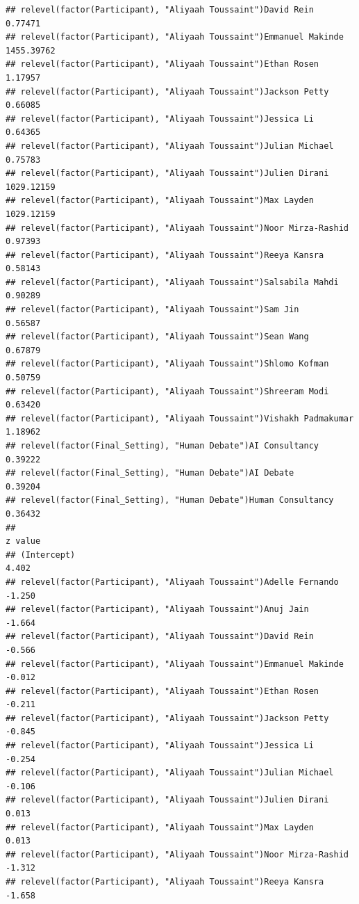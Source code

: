 \documentclass[
]{article}
\begin{document}
\begin{verbatim}
## relevel(factor(Participant), "Aliyaah Toussaint")David Rein            0.77471
## relevel(factor(Participant), "Aliyaah Toussaint")Emmanuel Makinde   1455.39762
## relevel(factor(Participant), "Aliyaah Toussaint")Ethan Rosen           1.17957
## relevel(factor(Participant), "Aliyaah Toussaint")Jackson Petty         0.66085
## relevel(factor(Participant), "Aliyaah Toussaint")Jessica Li            0.64365
## relevel(factor(Participant), "Aliyaah Toussaint")Julian Michael        0.75783
## relevel(factor(Participant), "Aliyaah Toussaint")Julien Dirani      1029.12159
## relevel(factor(Participant), "Aliyaah Toussaint")Max Layden         1029.12159
## relevel(factor(Participant), "Aliyaah Toussaint")Noor Mirza-Rashid     0.97393
## relevel(factor(Participant), "Aliyaah Toussaint")Reeya Kansra          0.58143
## relevel(factor(Participant), "Aliyaah Toussaint")Salsabila Mahdi       0.90289
## relevel(factor(Participant), "Aliyaah Toussaint")Sam Jin               0.56587
## relevel(factor(Participant), "Aliyaah Toussaint")Sean Wang             0.67879
## relevel(factor(Participant), "Aliyaah Toussaint")Shlomo Kofman         0.50759
## relevel(factor(Participant), "Aliyaah Toussaint")Shreeram Modi         0.63420
## relevel(factor(Participant), "Aliyaah Toussaint")Vishakh Padmakumar    1.18962
## relevel(factor(Final_Setting), "Human Debate")AI Consultancy           0.39222
## relevel(factor(Final_Setting), "Human Debate")AI Debate                0.39204
## relevel(factor(Final_Setting), "Human Debate")Human Consultancy        0.36432
##                                                                     z value
## (Intercept)                                                           4.402
## relevel(factor(Participant), "Aliyaah Toussaint")Adelle Fernando     -1.250
## relevel(factor(Participant), "Aliyaah Toussaint")Anuj Jain           -1.664
## relevel(factor(Participant), "Aliyaah Toussaint")David Rein          -0.566
## relevel(factor(Participant), "Aliyaah Toussaint")Emmanuel Makinde    -0.012
## relevel(factor(Participant), "Aliyaah Toussaint")Ethan Rosen         -0.211
## relevel(factor(Participant), "Aliyaah Toussaint")Jackson Petty       -0.845
## relevel(factor(Participant), "Aliyaah Toussaint")Jessica Li          -0.254
## relevel(factor(Participant), "Aliyaah Toussaint")Julian Michael      -0.106
## relevel(factor(Participant), "Aliyaah Toussaint")Julien Dirani        0.013
## relevel(factor(Participant), "Aliyaah Toussaint")Max Layden           0.013
## relevel(factor(Participant), "Aliyaah Toussaint")Noor Mirza-Rashid   -1.312
## relevel(factor(Participant), "Aliyaah Toussaint")Reeya Kansra        -1.658

\end{verbatim}
\end{document}
